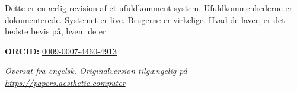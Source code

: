 \documentclass[10pt,letterpaper,twocolumn]{article}
\begin{document}
Dette er en ærlig revision af et ufuldkomment system. Ufuldkommenhederne er dokumenterede. Systemet er live. Brugerne er virkelige. Hvad de laver, er det bedste bevis på, hvem de er.

\vspace{0.5em}
\noindent\textbf{ORCID:} \href{https://orcid.org/0009-0007-4460-4913}{0009-0007-4460-4913}

\vspace{0.5em}\noindent\textit{Oversat fra engelsk. Originalversion tilgængelig på \url{https://papers.aesthetic.computer}}



\end{document}
